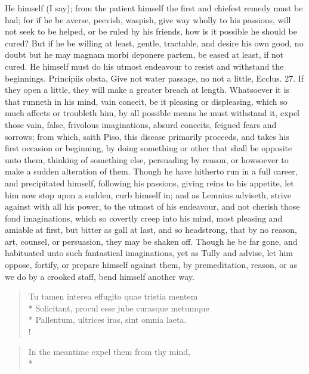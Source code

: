 {He himself (I say); from the patient himself the first and chiefest
remedy must be had; for if he be averse, peevish, waspish, give way
wholly to his passions, will not seek to be helped, or be ruled by his
friends, how is it possible he should be cured? But if he be willing at
least, gentle, tractable, and desire his own good, no doubt but he may
magnam morbi deponere partem, be eased at least, if not cured. He
himself must do his utmost endeavour to resist and withstand the
beginnings. Principiis obsta, Give not water passage, no not a little,
Ecclus.  27. If they open a little, they will make a greater breach
at length. Whatsoever it is that runneth in his mind, vain conceit, be
it pleasing or displeasing, which so much affects or troubleth him,
by all possible means he must withstand it, expel those vain,
false, frivolous imaginations, absurd conceits, feigned fears and
sorrows; from which, saith Piso, this disease primarily proceeds, and
takes his first occasion or beginning, by doing something or other that
shall be opposite unto them, thinking of something else, persuading by
reason, or howsoever to make a sudden alteration of them. Though he
have hitherto run in a full career, and precipitated himself, following
his passions, giving reins to his appetite, let him now stop upon a
sudden, curb himself in; and as Lemnius adviseth, strive against
with all his power, to the utmost of his endeavour, and not cherish
those fond imaginations, which so covertly creep into his mind, most
pleasing and amiable at first, but bitter as gall at last, and so
headstrong, that by no reason, art, counsel, or persuasion, they may be
shaken off. Though he be far gone, and habituated unto such fantastical
imaginations, yet as Tully and \Plutarch advise, let him oppose,
fortify, or prepare himself against them, by premeditation, reason, or
as we do by a crooked staff, bend himself another way.
%
%
\begin{latin}%
\begin{verse}%
Tu tamen interea effugito quae tristia mentem\\*
Solicitant, procul esse jube curasque metumque\\*
Pallentum, ultrices iras, sint omnia laeta.\\!
\end{verse}%
\end{latin}%
\translationrule%
\begin{verse}%
In the meantime expel them from thy mind,\\*

\end{verse}}
